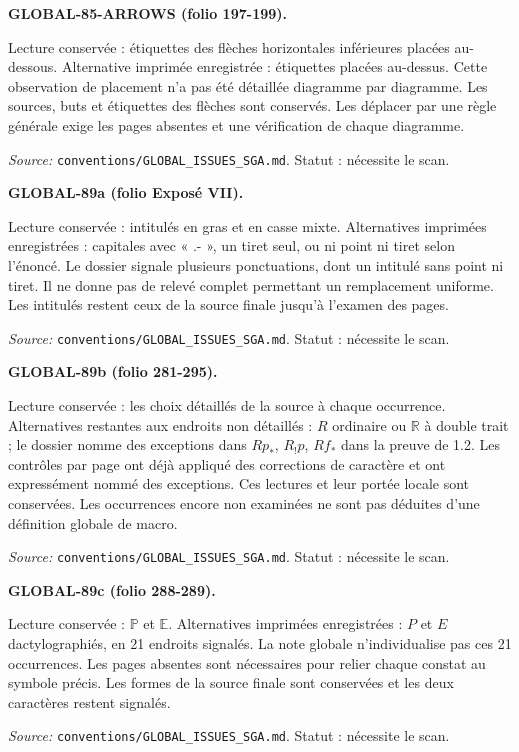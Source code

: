 \medskip\noindent\textbf{GLOBAL-85-ARROWS (folio 197-199).}\par
Lecture conservée : étiquettes des flèches horizontales inférieures placées au-dessous. Alternative imprimée enregistrée : étiquettes placées au-dessus.
Cette observation de placement n’a pas été détaillée diagramme par diagramme. Les sources, buts et étiquettes des flèches sont conservés. Les déplacer par une règle générale exige les pages absentes et une vérification de chaque diagramme.
\par\noindent\textit{Source: }\texttt{conventions/GLOBAL\_ISSUES\_SGA.md}. Statut : nécessite le scan.

\medskip\noindent\textbf{GLOBAL-89a (folio Exposé VII).}\par
Lecture conservée : intitulés en gras et en casse mixte. Alternatives imprimées enregistrées : capitales avec « .- », un tiret seul, ou ni point ni tiret selon l’énoncé.
Le dossier signale plusieurs ponctuations, dont un intitulé sans point ni tiret. Il ne donne pas de relevé complet permettant un remplacement uniforme. Les intitulés restent ceux de la source finale jusqu’à l’examen des pages.
\par\noindent\textit{Source: }\texttt{conventions/GLOBAL\_ISSUES\_SGA.md}. Statut : nécessite le scan.

\medskip\noindent\textbf{GLOBAL-89b (folio 281-295).}\par
Lecture conservée : les choix détaillés de la source à chaque occurrence. Alternatives restantes aux endroits non détaillés : $R$ ordinaire ou $\mathbb{R}$ à double trait ; le dossier nomme des exceptions dans $Rp_*$, $R_!p$, $Rf_*$ dans la preuve de 1.2.
Les contrôles par page ont déjà appliqué des corrections de caractère et ont expressément nommé des exceptions. Ces lectures et leur portée locale sont conservées. Les occurrences encore non examinées ne sont pas déduites d’une définition globale de macro.
\par\noindent\textit{Source: }\texttt{conventions/GLOBAL\_ISSUES\_SGA.md}. Statut : nécessite le scan.

\medskip\noindent\textbf{GLOBAL-89c (folio 288-289).}\par
Lecture conservée : $\mathbb{P}$ et $\mathbb{E}$. Alternatives imprimées enregistrées : $P$ et $E$ dactylographiés, en 21 endroits signalés.
La note globale n’individualise pas ces 21 occurrences. Les pages absentes sont nécessaires pour relier chaque constat au symbole précis. Les formes de la source finale sont conservées et les deux caractères restent signalés.
\par\noindent\textit{Source: }\texttt{conventions/GLOBAL\_ISSUES\_SGA.md}. Statut : nécessite le scan.

